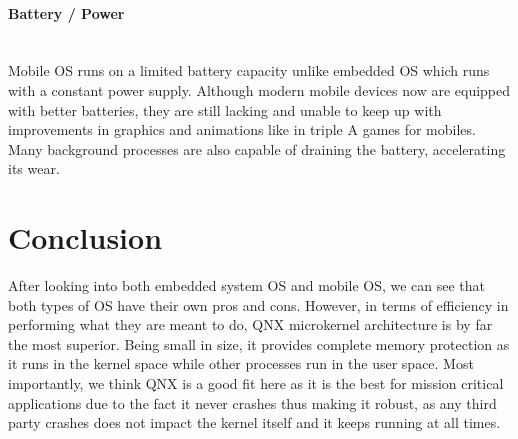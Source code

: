\documentclass[conference]{IEEEtran}
\newcommand{\forceindent}{\leavevmode{\parindent=1em\indent}}
\begin{document}
\medskip
\paragraph{Battery / Power} \mbox{} \\
\forceindent Mobile OS runs on a limited battery capacity unlike embedded OS which runs with a constant power supply. Although modern mobile devices now are equipped with better batteries, they are still lacking and unable to keep up with improvements in graphics and animations like in triple A games for mobiles. Many background processes are also capable of draining the battery, accelerating its wear.

\section{Conclusion}
\forceindent After looking into both embedded system OS and mobile OS, we can see that both types of OS have their own pros and cons. However, in terms of efficiency in performing what they are meant to do, QNX microkernel architecture is by far the most superior. Being small in size, it provides complete memory protection as it runs in the kernel space while other processes run in the user space. Most importantly, we think QNX is a good fit here as it is the best for mission critical applications due to the fact it never crashes thus making it robust, as any third party crashes does not impact the kernel itself and it keeps running at all times\cite{quora}.




\end{document}
